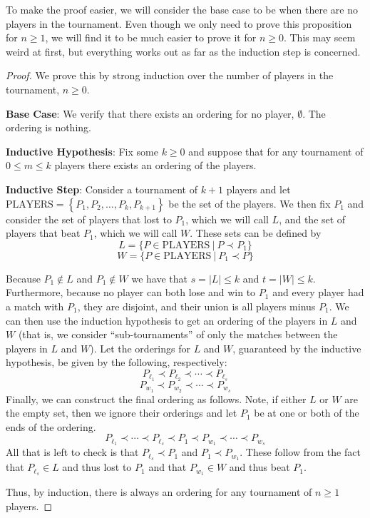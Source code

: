 \documentclass{article}
\theoremstyle{plain}
\theoremstyle{definition}
\begin{document}
To make the proof easier, we will consider the base case to be when there are no players in the tournament. Even though we only need to prove this proposition for \(n \geq 1\), we will find it to be much easier to prove it for \(n \geq 0\). This may seem weird at first, but everything works out as far as the induction step is concerned.

\begin{proof}
    We prove this by strong induction over the number of players in the tournament, \(n \geq 0\).
    
    \textbf{Base Case}: We verify that there exists an ordering for no player, \(\emptyset\). The ordering is nothing.

    \textbf{Inductive Hypothesis}: Fix some \(k \geq 0\) and suppose that for any tournament of \(0 \leq m \leq k\) players there exists an ordering of the players.

    \textbf{Inductive Step}: Consider a tournament of \(k+1\) players and let \(\text{PLAYERS} = \left\{P_1, P_2, \dotsc, P_k, P_{k+1}\right\}\) be the set of the players. We then fix \(P_1\) and consider the set of players that lost to \(P_1\), which we will call \(L\), and the set of players that beat \(P_1\), which we will call \(W\). These sets can be defined by 
    \[L = \{P \in \text{PLAYERS}\ |\ P \prec P_1\}\]
    \[W = \{P \in \text{PLAYERS}\ |\ P_1 \prec P\}\]

    Because \(P_1 \notin L\) and \(P_1 \notin W\) we have that \(s = |L| \leq k\) and \(t = |W| \leq k\). Furthermore, because no player can both lose and win to \(P_1\) and every player had a match with \(P_1\), they are disjoint, and their union is all players minus \(P_1\). We can then use the induction hypothesis to get an ordering of the players in \(L\) and \(W\) (that is, we consider ``sub-tournaments'' of only the matches between the players in \(L\) and \(W\)). Let the orderings for \(L\) and \(W\), guaranteed by the inductive hypothesis, be given by the following, respectively:
    \[P_{\ell_1} \prec P_{\ell_2} \prec \cdots \prec P_{\ell_s}\]
    \[P_{w_1} \prec P_{w_2} \prec \cdots \prec P_{w_s}\]
    Finally, we can construct the final ordering as follows. Note, if either \(L\) or \(W\) are the empty set, then we ignore their orderings and let \(P_1\) be at one or both of the ends of the ordering.
    \[P_{\ell_1} \prec \cdots \prec P_{\ell_s} \prec P_1 \prec P_{w_1} \prec \cdots \prec P_{w_s}\]
    All that is left to check is that \(P_{\ell_s} \prec P_1\) and \(P_1 \prec P_{w_1}\). These follow from the fact that \(P_{\ell_s} \in L\) and thus lost to \(P_1\) and that \(P_{w_1} \in W\) and thus beat \(P_1\).

    Thus, by induction, there is always an ordering for any tournament of \(n \geq 1\) players.
\end{proof}
\end{document}
